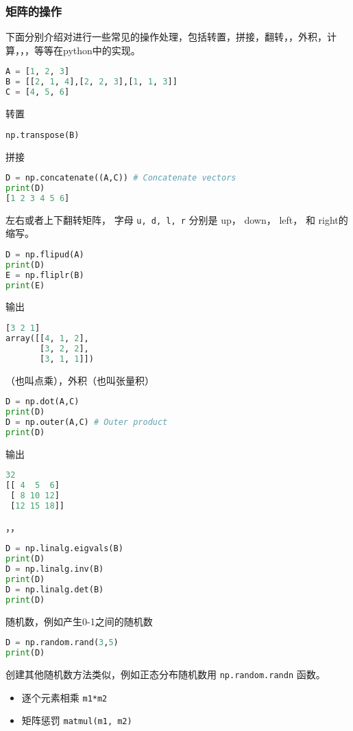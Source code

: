 \subsubsection{矩阵的操作}
下面分别介绍对进行一些常见的操作处理，包括转置，拼接，翻转，，外积，计算，，，等等在python中的实现。
\begin{lstlisting}[language=python]
A = [1, 2, 3]
B = [[2, 1, 4],[2, 2, 3],[1, 1, 3]]
C = [4, 5, 6]
\end{lstlisting}
转置
\begin{lstlisting}[language=python]
np.transpose(B)
\end{lstlisting}
拼接
\begin{lstlisting}[language=python]
D = np.concatenate((A,C)) # Concatenate vectors
print(D)
[1 2 3 4 5 6]
\end{lstlisting}
左右或者上下翻转矩阵， 字母 \verb`u, d, l, r` 分别是 up， down，  left， 和  right的缩写。
\begin{lstlisting}[language=python]
D = np.flipud(A) 
print(D)
E = np.fliplr(B) 
print(E)
\end{lstlisting}
输出
\begin{lstlisting}[language=python]
[3 2 1]
array([[4, 1, 2],
       [3, 2, 2],
       [3, 1, 1]])
\end{lstlisting}
（也叫点乘），外积（也叫张量积）
\begin{lstlisting}[language=python]
D = np.dot(A,C) 
print(D)
D = np.outer(A,C) # Outer product
print(D)
\end{lstlisting}
输出
\begin{lstlisting}[language=python]
32
[[ 4  5  6]
 [ 8 10 12]
 [12 15 18]]
\end{lstlisting}
，，
\begin{lstlisting}[language=python]
D = np.linalg.eigvals(B) 
print(D)
D = np.linalg.inv(B)
print(D)
D = np.linalg.det(B)
print(D)
\end{lstlisting}
随机数，例如产生0-1之间的随机数
\begin{lstlisting}[language=python]
D = np.random.rand(3,5) 
print(D)
\end{lstlisting}
创建其他随机数方法类似，例如正态分布随机数用 \verb`np.random.randn` 函数。

\begin{itemize}
\item 逐个元素相乘 \verb`m1*m2`
\item 矩阵惩罚 \verb`matmul(m1, m2)`
\end{itemize}
